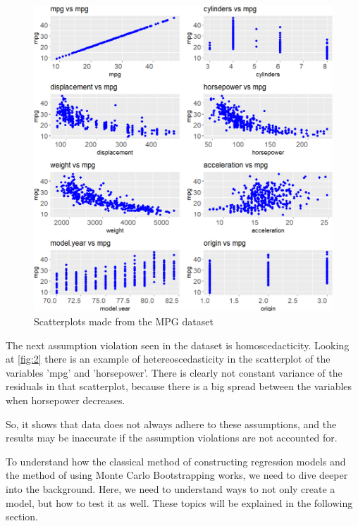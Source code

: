 \begin{figure}[h]
	\includegraphics[width=\linewidth]{billder/2.png}
	\caption{Scatterplots made from the MPG dataset}
	\label{fig:2}
\end{figure}

\noindent The next assumption violation seen in the dataset is homoscedacticity. Looking at \autoref{fig:2} there is an example of hetereoscedasticity in the scatterplot of the variables 'mpg' and 'horsepower'. There is clearly not constant variance of the residuals in that scatterplot, because there is a big spread between the variables when horsepower decreases. \newline

\noindent So, it shows that data does not always adhere to these assumptions, and the results may be inaccurate if the assumption violations are not accounted for. \newline


\noindent To understand how the classical method of constructing regression models and the method of using Monte Carlo Bootstrapping works, we need to dive deeper into the background. Here, we need to understand ways to not only create a model, but how to test it as well. These topics will be explained in the following section.

